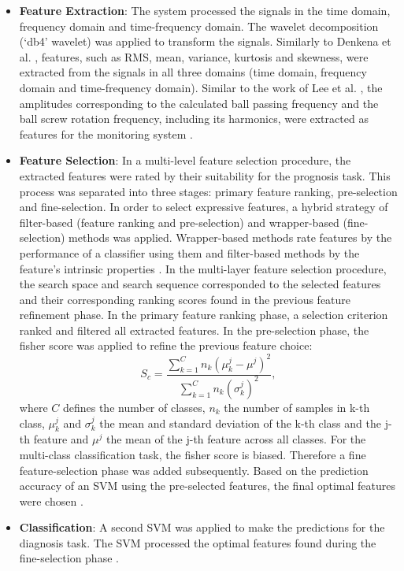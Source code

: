 \begin{itemize}
    \item \textbf{Feature Extraction}: The system processed the signals in the time domain, frequency domain and time-frequency domain. The wavelet decomposition (‘db4’ wavelet) was applied to transform the signals. Similarly to Denkena et al. \cite{Denkena2021}, features, such as RMS, mean, variance, kurtosis and skewness, were extracted from the signals in all three domains (time domain, frequency domain and time-frequency domain). Similar to the work of Lee et al. \cite{Lee2015}, the amplitudes corresponding to the calculated ball passing frequency and the ball screw rotation frequency, including its harmonics, were extracted as features for the monitoring system \cite{LiPin2018}.
    \item \textbf{Feature Selection}: In a multi-level feature selection procedure, the extracted features were rated by their suitability for the prognosis task. This process was separated into three stages: primary feature ranking, pre-selection and fine-selection. In order to select expressive features, a hybrid strategy of filter-based (feature ranking and pre-selection) and wrapper-based (fine-selection) methods was applied. Wrapper-based methods rate features by the performance of a classifier using them and filter-based methods by the feature's intrinsic properties \cite{Wald2013}. In the multi-layer feature selection procedure, the search space and search sequence corresponded to the selected features and their corresponding ranking scores found in the previous feature refinement phase. In the primary feature ranking phase, a selection criterion ranked and filtered all extracted features. In the pre-selection phase, the fisher score was applied to refine the previous feature choice:
    \begin{equation}
        S_{c} = \frac{\sum_{k=1}^{C} n_{k}(\mu_{k}^{j}-\mu^{j})^{2}}{\sum_{k=1}^{C}n_{k}(\sigma_{k}^{j})^{2}},
    \end{equation}
    where $C$ defines the number of classes, $n_{k}$ the number of samples in k-th class, $\mu_{k}^{j}$ and $\sigma_{k}^{j}$ the mean and standard deviation of the k-th class and the j-th feature and $\mu^{j}$ the mean of the j-th feature across all classes. For the multi-class classification task, the fisher score is biased. Therefore a fine feature-selection phase was added subsequently. Based on the prediction accuracy of an SVM using the pre-selected features, the final optimal features were chosen \cite{LiPin2018}.
    \item \textbf{Classification}: A second SVM was applied to make the predictions for the diagnosis task. The SVM processed the optimal features found during the fine-selection phase \cite{LiPin2018}. 
\end{itemize}

